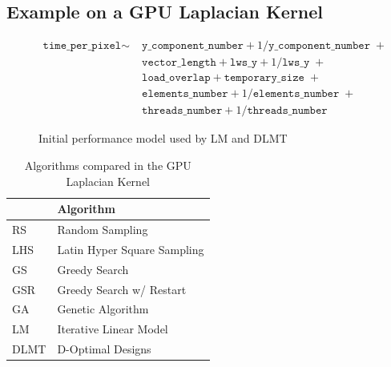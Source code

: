 \documentclass[conference]{IEEEtran}
\begin{document}
\subsection{Example on a GPU Laplacian Kernel}
\label{sec:org737675f}
\begin{figure}
{\scriptsize
\begin{align*}
\texttt{time\_per\_pixel} \sim & \; \texttt{y\_component\_number} + 1 / \texttt{y\_component\_number} \; + \\
& \; \texttt{vector\_length} + \texttt{lws\_y} + 1 / \texttt{lws\_y} \; + \\
& \; \texttt{load\_overlap} + \texttt{temporary\_size} \; + \\
& \; \texttt{elements\_number} + 1 / \texttt{elements\_number} \; + \\
& \; \texttt{threads\_number} + 1 /\texttt{threads\_number}
\end{align*}
}
\caption{Initial performance model used by LM and DLMT}
\end{figure}

\begin{table}[ht]
\caption{Algorithms compared in the GPU Laplacian Kernel}
\centering
\footnotesize
\begin{tabular}{ll}
\toprule
 & Algorithm\\
\midrule
RS & Random Sampling\\
LHS & Latin Hyper Square Sampling\\
GS & Greedy Search\\
GSR & Greedy Search w/ Restart\\
GA & Genetic Algorithm\\
LM & Iterative Linear Model\\
DLMT & D-Optimal Designs\\
\bottomrule
\end{tabular}
\end{table}
\end{document}
